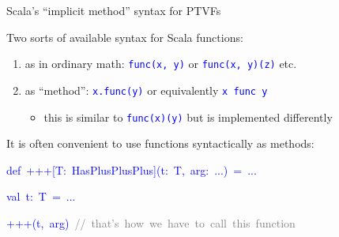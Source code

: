 \documentclass[english]{beamer}
\newenvironment{lyxcode}
   {\par\begin{list}{}{
     \setlength{\rightmargin}{\leftmargin}
     \setlength{\listparindent}{0pt}%
     \raggedright
     \setlength{\itemsep}{0pt}
     \setlength{\parsep}{0pt}
     \normalfont\ttfamily}%
    \def\{{\char`\{}
    \def\}{\char`\}}
    \def\textasciitilde{\char`\~}
    \item[]}
   {\end{list}}
\begin{document}
\begin{frame}{Scala's ``implicit method'' syntax for PTVFs}

Two sorts of available syntax for Scala functions:
\begin{enumerate}
\item as in ordinary math: \texttt{\textcolor{blue}{\footnotesize{}func(x,
y)}} or \texttt{\textcolor{blue}{\footnotesize{}func(x, y)(z)}} etc.
\item as ``method'': \texttt{\textcolor{blue}{\footnotesize{}x.func(y)}}
or equivalently \texttt{\textcolor{blue}{\footnotesize{}x func y}}
\ 
\begin{itemize}
\item this is similar to \texttt{\textcolor{blue}{\footnotesize{}func(x)(y)}}
but is implemented differently
\end{itemize}
\end{enumerate}
It is often convenient to use functions syntactically as methods:
\begin{lyxcode}
\textcolor{blue}{\footnotesize{}def~+++{[}T:~HasPlusPlusPlus{]}(t:~T,~arg:~...)~=~...}{\footnotesize \par}

\textcolor{blue}{\footnotesize{}val~t:~T~=~...}{\footnotesize \par}

\textcolor{blue}{\footnotesize{}+++(t,~arg)~}\textrm{\textcolor{gray}{\footnotesize{}//~that's~how~we~have~to~call~this~function}}{\footnotesize \par}


\end{lyxcode}
\end{frame}
\end{document}
